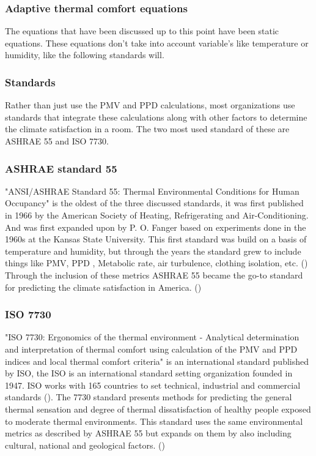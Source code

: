 \documentclass[12pt,a4paper]{article}
\begin{document}
\subsubsection{Adaptive thermal comfort equations}
The equations that have been discussed up to this point have been static equations. These equations don't take into account variable's like temperature or humidity, like the following standards will.
\subsubsection{Standards}
Rather than just use the PMV and PPD calculations, most organizations use standards that integrate these calculations along with other factors to determine  the climate satisfaction in a room. The two most used standard of these are ASHRAE 55 and ISO 7730.


\subsubsection{ASHRAE standard 55}
"ANSI/ASHRAE Standard 55: Thermal Environmental Conditions for Human Occupancy" is the oldest of the three discussed standards, it was first published in 1966 by the American Society of Heating, Refrigerating and Air-Conditioning.	And was first expanded upon by P. O. Fanger  based on experiments done in the 1960s at the Kansas State University. This first standard was build on a basis of temperature and humidity, but through the years the standard grew to include things like PMV, PPD , Metabolic rate, air turbulence, clothing isolation, etc. (\cite{999821325502121}) Through the inclusion of these metrics ASHRAE 55 became the go-to standard for predicting the climate satisfaction in America. 
(\cite{ASHRAE})

\subsubsection{ISO 7730}
"ISO 7730: Ergonomics of the thermal environment - Analytical determination and interpretation of thermal comfort using calculation of the PMV and PPD indices and local thermal comfort criteria" is an international standard published by ISO, the ISO is an international standard setting organization founded in 1947. ISO works with 165 countries to set technical, industrial and commercial standards (\cite{iso_2021}). The 7730 standard presents methods for predicting the general thermal sensation and degree of thermal dissatisfaction of healthy people exposed to moderate thermal environments. This standard uses the same environmental  metrics as described by ASHRAE 55 but expands on them by also including cultural, national and geological factors. 
(\cite{ISO7730})
\end{document}
